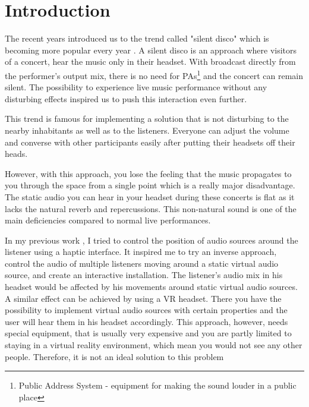 \documentclass{ctuthesis}
\begin{document}
\maketitle
\chapter{Introduction} \label{introduction}

The recent years introduced us to the trend called "silent disco" which is becoming more popular every year \cite{98}.  A silent disco is an approach where visitors of a concert, hear the music only in their headset. With broadcast directly from the performer's output mix, there is no need for PAs\footnote{Public Address System - equipment for making the sound louder in a public place\cite{99}} and the concert can remain silent. The possibility to experience live music performance without any disturbing effects inspired us to push this interaction even further.

This trend is famous for implementing a solution that is not disturbing to the nearby inhabitants as well as to the listeners.  Everyone can adjust the volume and converse with other participants easily after putting their headsets off their heads.

However, with this approach, you lose the feeling that the music propagates to you through the space from a single point which is a really major disadvantage. The static audio you can hear in your headset during these concerts is flat as it lacks the natural reverb and repercussions. This non-natural sound is one of the main deficiencies compared to normal live performances. 

In my previous work \cite{97}, I tried to control the position of audio sources around the listener using a haptic interface. It inspired me to try an inverse approach, control the audio of multiple listeners moving around a static virtual audio source, and create an interactive installation. The listener's audio mix in his headset would be affected by his movements around static virtual audio sources. A similar effect can be achieved by using a VR headset. There you have the possibility to implement virtual audio sources with certain properties and the user will hear them in his headset accordingly. This approach, however, needs special equipment, that is usually very expensive and you are partly limited to staying in a virtual reality environment, which mean you would not see any other people. Therefore, it is not an ideal solution to this problem 
\end{document}
